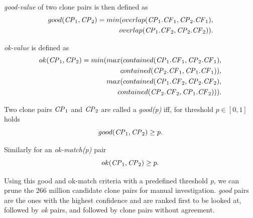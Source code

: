 \documentclass[sigconf,review, anonymous]{acmart}
\newcommand{\squeezeup}{\vspace{-0.5mm}}
\begin{document}
\noindent\textit{good-value} of two clone pairs is then defined as
\begin{align*}
	good(\textrm{\textit{CP}}_1, \textrm{\textit{CP}}_2) = min(overlap(\textrm{\textit{CP}}_1.\textrm{\textit{CF}}_1,\textrm{\textit{CP}}_2.\textrm{\textit{CF}}_1), \\ overlap(\textrm{\textit{CP}}_1.\textrm{\textit{CF}}_2,\textrm{\textit{CP}}_2.\textrm{\textit{CF}}_2)).
\end{align*}

\noindent\textit{ok-value} is defined as
\begin{align*}
	ok(\textrm{\textit{CP}}_1,\textrm{\textit{CP}}_2) = min(max(contained(\textrm{\textit{CP}}_1.\textrm{\textit{CF}}_1,\textrm{\textit{CP}}_2.\textrm{\textit{CF}}_1), \\ contained(\textrm{\textit{CP}}_2.\textrm{\textit{CF}}_1,\textrm{\textit{CP}}_1.\textrm{\textit{CF}}_1)),
	\\ max(contained(\textrm{\textit{CP}}_1.\textrm{\textit{CF}}_2,\textrm{\textit{CP}}_2.\textrm{\textit{CF}}_2), \\contained(\textrm{\textit{CP}}_2.\textrm{\textit{CF}}_2,\textrm{\textit{CP}}_1.\textrm{\textit{CF}}_2))).
\end{align*}

Two clone pairs $\textrm{\textit{CP}}_1$ and $\textrm{\textit{CP}}_2$ are called a \textit{\textit{good}(p)} iff, for threshold $p \in [0,1]$ holds 
\begin{equation}
good(\textrm{\textit{CP}}_1,\textrm{\textit{CP}}_2) \geq p.
\end{equation}

Similarly for an \textit{ok-match(p)} pair
\begin{equation}
ok(\textrm{\textit{CP}}_1,\textrm{\textit{CP}}_2) \geq p.
\end{equation}

Using this good and ok-match criteria with a predefined threshold \textit{p}, we can prune the 266 million candidate clone pairs for manual investigation. \textit{good} pairs are the ones with the highest confidence and are ranked first to be looked at, followed by \textit{ok} pairs, and followed by clone pairs without agreement.
\end{document}

